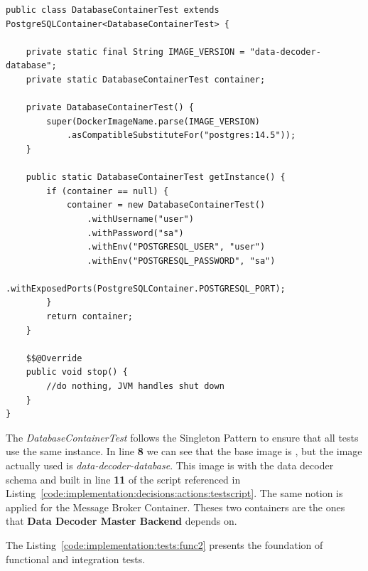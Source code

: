 \begin{lstlisting}[style=Java, caption=Functional Test - Message Broker - \textbf{Data Decoder Master Backend} Setup, label={code:implementation:tests:func1}]
public class DatabaseContainerTest extends PostgreSQLContainer<DatabaseContainerTest> {

    private static final String IMAGE_VERSION = "data-decoder-database";
    private static DatabaseContainerTest container;

    private DatabaseContainerTest() {
        super(DockerImageName.parse(IMAGE_VERSION)
            .asCompatibleSubstituteFor("postgres:14.5"));
    }

    public static DatabaseContainerTest getInstance() {
        if (container == null) {
            container = new DatabaseContainerTest()
                .withUsername("user")
                .withPassword("sa")
                .withEnv("POSTGRESQL_USER", "user")
                .withEnv("POSTGRESQL_PASSWORD", "sa")
                .withExposedPorts(PostgreSQLContainer.POSTGRESQL_PORT);
        }
        return container;
    }

    $$@Override
    public void stop() {
        //do nothing, JVM handles shut down
    }
}    
\end{lstlisting}

The \textit{DatabaseContainerTest} follows the Singleton Pattern to ensure that all tests use the same instance. In line \textbf{8} we can see that the base image is , but the image actually used is \textit{data-decoder-database}. This image is  with the data decoder schema and built in line \textbf{11} of the script referenced in Listing~\ref{code:implementation:decisions:actions:testscript}. The same notion is applied for the Message Broker Container. Theses two containers are the ones that \textbf{Data Decoder Master Backend} depends on.

The Listing~\ref{code:implementation:tests:func2} presents the foundation of functional and integration tests.

